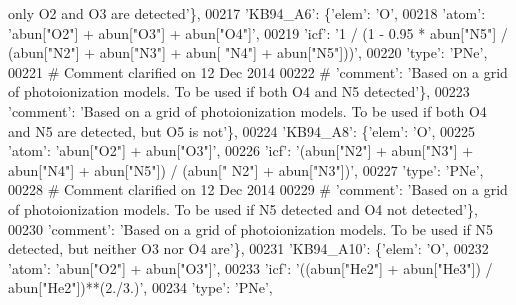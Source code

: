 \begin{DoxyCode}
{       only O2 and O3 are detected'}\},
00217                          \textcolor{stringliteral}{'KB94\_A6'}: \{\textcolor{stringliteral}{'elem'}: \textcolor{stringliteral}{'O'},
00218                                      \textcolor{stringliteral}{'atom'}: \textcolor{stringliteral}{'abun["O2"] + abun["O3"] + abun["O4"]'},
00219                                       \textcolor{stringliteral}{'icf'}: \textcolor{stringliteral}{'1 / (1 - 0.95 * abun["N5"] / (abun["N2"] + abun["N3"] + abun[
      "N4"] + abun["N5"]))'},
00220                                       \textcolor{stringliteral}{'type'}: \textcolor{stringliteral}{'PNe'},
00221 \textcolor{comment}{# Comment clarified on 12 Dec 2014 }
00222 \textcolor{comment}{#                                      'comment': 'Based on a grid of photoionization models. To be used if
       both O4 and N5 detected'\},}
00223                                       \textcolor{stringliteral}{'comment'}: \textcolor{stringliteral}{'Based on a grid of photoionization models. To be used if
       both O4 and N5 are detected, but O5 is not'}\},
00224                          \textcolor{stringliteral}{'KB94\_A8'}: \{\textcolor{stringliteral}{'elem'}: \textcolor{stringliteral}{'O'},
00225                                      \textcolor{stringliteral}{'atom'}: \textcolor{stringliteral}{'abun["O2"] + abun["O3"]'},
00226                                      \textcolor{stringliteral}{'icf'}: \textcolor{stringliteral}{'(abun["N2"] + abun["N3"] + abun["N4"] + abun["N5"]) / (abun["
      N2"] + abun["N3"])'},
00227                                      \textcolor{stringliteral}{'type'}: \textcolor{stringliteral}{'PNe'},
00228 \textcolor{comment}{# Comment clarified on 12 Dec 2014 }
00229 \textcolor{comment}{#                                     'comment': 'Based on a grid of photoionization models. To be used if
       N5 detected and O4 not detected'\},}
00230                                      \textcolor{stringliteral}{'comment'}: \textcolor{stringliteral}{'Based on a grid of photoionization models. To be used if
       N5 detected, but neither O3 nor O4 are'}\},
00231                          \textcolor{stringliteral}{'KB94\_A10'}: \{\textcolor{stringliteral}{'elem'}: \textcolor{stringliteral}{'O'},
00232                                       \textcolor{stringliteral}{'atom'}: \textcolor{stringliteral}{'abun["O2"] + abun["O3"]'},
00233                                       \textcolor{stringliteral}{'icf'}: \textcolor{stringliteral}{'((abun["He2"] + abun["He3"]) / abun["He2"])**(2./3.)'},
00234                                       \textcolor{stringliteral}{'type'}: \textcolor{stringliteral}{'PNe'},

\end{DoxyCode}

